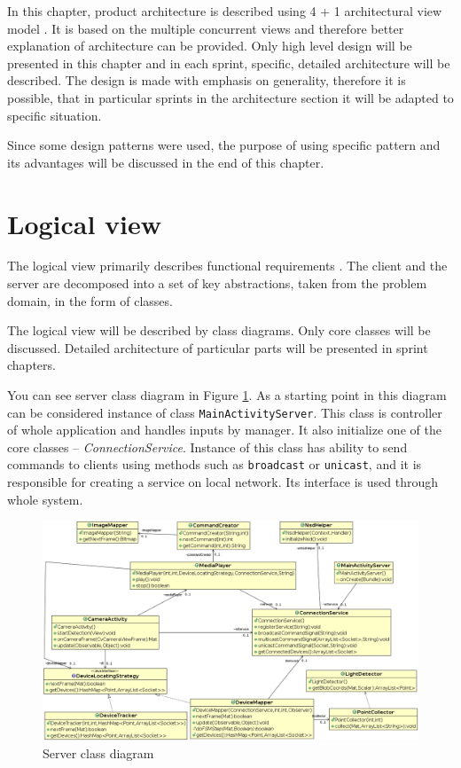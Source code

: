 In this chapter, product architecture is described using 4 + 1 architectural view model \cite{Kruchten:1995:VMA:624610.625529}. It is based on the multiple concurrent views and therefore better explanation of architecture can be provided.
Only high level design will be presented in this chapter and in each sprint, specific, detailed architecture will be described.
The design is made with emphasis on generality, therefore it is possible, that in particular sprints in the architecture section it will be adapted to specific situation.

Since some design patterns were used, the purpose of using specific pattern and its advantages will be discussed in the end of this chapter.

\section{Logical view}
The logical view  primarily describes functional requirements \cite[p.~3]{Kruchten:1995:VMA:624610.625529}. 
The client and the server are decomposed into a set of key abstractions, taken from the problem domain, in the form of classes. 

The logical view will be described by class diagrams.
Only core classes will be discussed. 
Detailed architecture of particular parts will be presented in sprint chapters.

You can see server class diagram in Figure \ref{fig:architecture_class_diagram_server}.
As a starting point in this diagram can be considered instance of class \texttt{MainActivityServer}.
This class is controller of whole application and handles inputs by manager.
It also initialize one of the core classes -- \emph{ConnectionService}.
Instance of this class has ability to send commands to clients using methods such as \texttt{broadcast} or \texttt{unicast}, and it is responsible for creating a service on local network.
Its interface is used through whole system.
\begin{figure}[!h]
	\centering
		\includegraphics[width=21.5cm, angle=90]{softwareArchitecture/class_diagram_server.png}
	\caption{Server class diagram}
	\label{fig:architecture_class_diagram_server}
\end{figure}

